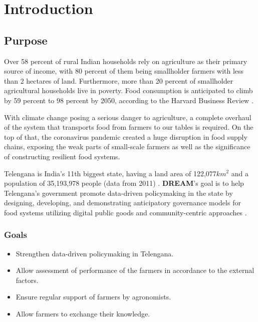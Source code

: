 \chapter{Introduction}

\section{Purpose}



Over 58 percent of rural Indian households rely on agriculture as their primary source of income, with 80 percent of them being smallholder farmers with less than 2 hectares of land. Furthermore, more than 20 percent of smallholder agricultural households live in poverty. Food consumption is anticipated to climb by 59 percent to 98 percent by 2050, according to the Harvard Business Review \cite{global_demand_for_food}. 

With climate change posing a serious danger to agriculture, a complete overhaul of the system that transports food from farmers to our tables is required. On the top of that, the coronavirus pandemic created a huge disruption in food supply chains, exposing the weak parts of small-scale farmers as well as the significance of constructing resilient food systems.

Telengana is India's 11th biggest state, having a land area of 122,077$km^2$ and a population of 35,193,978 people (data from 2011) \cite{telengana}. \textbf{DREAM}'s goal is to help Telengana’s government promote data-driven policymaking in the state by designing, developing, and demonstrating anticipatory governance models for food systems utilizing digital public goods and community-centric approaches \cite{reference_doc}.

\subsection{Goals}
\begin{itemize}
    \item Strengthen data-driven policymaking in Telengana.
    \item Allow assessment of performance of the farmers in accordance to the external factors.
    \item Ensure regular support of farmers by agronomists.
    \item Allow farmers to exchange their knowledge.
\end{itemize}

